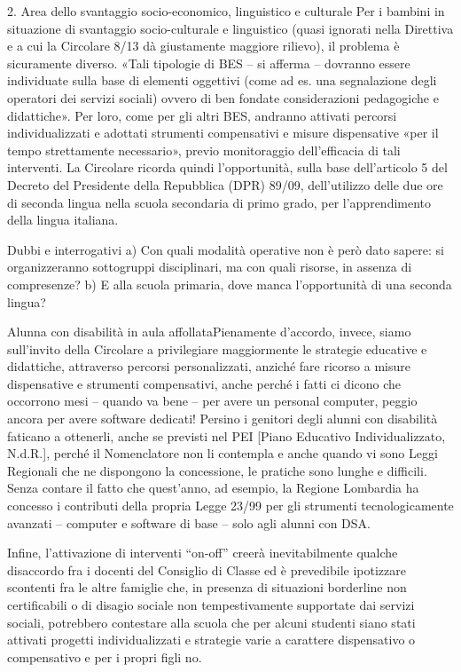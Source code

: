 2. Area dello svantaggio socio-economico, linguistico e culturale
Per i bambini in situazione di svantaggio socio-culturale e linguistico (quasi ignorati nella Direttiva e a cui la Circolare 8/13 dà giustamente maggiore rilievo), il problema è sicuramente diverso. «Tali tipologie di BES – si afferma – dovranno essere individuate sulla base di elementi oggettivi (come ad es. una segnalazione degli operatori dei servizi sociali) ovvero di ben fondate considerazioni pedagogiche e didattiche». Per loro, come per gli altri BES, andranno attivati percorsi individualizzati e adottati strumenti compensativi e misure dispensative «per il tempo strettamente necessario», previo monitoraggio dell’efficacia di tali interventi.
La Circolare ricorda quindi l’opportunità, sulla base dell’articolo 5 del Decreto del Presidente della Repubblica (DPR) 89/09, dell’utilizzo delle due ore di seconda lingua nella scuola secondaria di primo grado, per l’apprendimento della lingua italiana.

Dubbi e interrogativi
a) Con quali modalità operative non è però dato sapere: si organizzeranno sottogruppi disciplinari, ma con quali risorse, in assenza di compresenze?
b) E alla scuola primaria, dove manca l’opportunità di una seconda lingua?

Alunna con disabilità in aula affollataPienamente d’accordo, invece, siamo sull’invito della Circolare a privilegiare maggiormente le strategie educative e didattiche, attraverso percorsi personalizzati, anziché fare ricorso a misure dispensative e strumenti compensativi, anche perché i fatti ci dicono che occorrono mesi – quando va bene – per avere un personal computer, peggio ancora per avere software dedicati! Persino i genitori degli alunni con disabilità faticano a ottenerli, anche se previsti nel PEI [Piano Educativo Individualizzato, N.d.R.], perché il Nomenclatore non li contempla e anche quando vi sono Leggi Regionali che ne dispongono la concessione, le pratiche sono lunghe e difficili. Senza contare il fatto che quest’anno, ad esempio, la Regione Lombardia ha concesso i contributi della propria Legge 23/99 per gli strumenti tecnologicamente avanzati – computer e software di base – solo agli alunni con DSA.

Infine, l’attivazione di interventi “on-off” creerà inevitabilmente qualche disaccordo fra i docenti del Consiglio di Classe ed è prevedibile ipotizzare scontenti fra le altre famiglie che, in presenza di situazioni borderline non certificabili o di disagio sociale non tempestivamente supportate dai servizi sociali, potrebbero contestare alla scuola che per alcuni studenti siano stati attivati progetti individualizzati e strategie varie a carattere dispensativo o compensativo e per i propri figli no.

